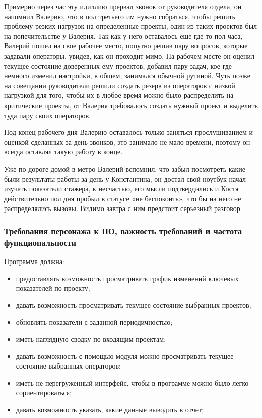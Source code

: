 Примерно через час эту идиллию прервал звонок от руководителя отдела, он напомнил Валерию, что в пол третьего им нужно собраться, чтобы решить проблему резких нагрузок на определенные проекты, один из таких проектов был на попечительстве у Валерия. Так как у него оставалось еще где-то пол часа, Валерий пошел на свое рабочее место, попутно решив пару вопросов, которые задавали операторы, увидев, как он проходит мимо. На рабочем месте он оценил текущее состояние доверенных ему проектов, добавил пару задач, кое-где немного изменил настройки, в общем, занимался обычной рутиной. Чуть позже на совещании руководители решили создать резерв из операторов с низкой нагрузкой для того, чтобы их в любое время можно было распределить на критические проекты, от Валерия требовалось создать нужный проект и выделить туда пару своих операторов.

Под конец рабочего дня Валерию оставалось только заняться прослушиванием и оценкой сделанных за день звонков, это занимало не мало времени, поэтому он всегда оставлял такую работу в конце.

Уже по дороге домой в метро Валерий вспомнил, что забыл посмотреть какие были результаты работы за день у Константина, он достал свой ноутбук начал изучать показатели стажера, к несчастью, его мысли подтвердились и Костя действительно пол дня пробыл в статусе «не беспокоить», что бы на него не распределялись вызовы. Видимо завтра с ним предстоит серьезный разговор.

\subsubsection{Требования персонажа к ПО, важность требований и частота функциональности}

Программа должна:
\begin{itemize}
    \item предоставлять возможность просматривать график изменений ключевых показателей по проекту;
    \item давать возможность просматривать текущее состояние выбранных проектов;
    \item обновлять показатели с заданной периодичностью;
    \item иметь наглядную сводку по входящим проектам;
    \item давать возможность с помощью модуля можно просматривать текущее состояние выбранных операторов;
    \item иметь не перегруженный интерфейс, чтобы в программе можно было легко сориентироваться;
    \item давать возможность указать, какие данные выводить в отчет;
\end{itemize}

